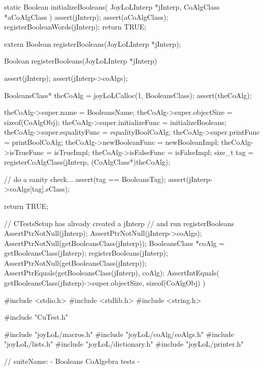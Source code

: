 \stopCHeader

\startCCode
static Boolean initializeBooleans(
  JoyLoLInterp *jInterp,
  CoAlgClass   *aCoAlgClass
) {
  assert(jInterp);
  assert(aCoAlgClass);
  registerBooleanWords(jInterp);
  return TRUE;
}
\stopCCode

\startCHeader
extern Boolean registerBooleans(JoyLoLInterp *jInterp);
\stopCHeader
{}

\startCCode
Boolean registerBooleans(JoyLoLInterp *jInterp) {
  assert(jInterp);
  assert(jInterp->coAlgs);
  
  BooleansClass* theCoAlg
    = joyLoLCalloc(1, BooleansClass);
  assert(theCoAlg);
  
  theCoAlg->super.name           = BooleansName;
  theCoAlg->super.objectSize     = sizeof(CoAlgObj);
  theCoAlg->super.initializeFunc = initializeBooleans;
  theCoAlg->super.equalityFunc   = equalityBoolCoAlg;
  theCoAlg->super.printFunc      = printBoolCoAlg;
  theCoAlg->newBooleanFunc       = newBooleanImpl;
  theCoAlg->isTrueFunc           = isTrueImpl;
  theCoAlg->isFalseFunc          = isFalseImpl;
  size_t tag =
    registerCoAlgClass(jInterp, (CoAlgClass*)theCoAlg);
  
  // do a sanity check...
  assert(tag == BooleansTag);
  assert(jInterp->coAlgs[tag].sClass);
   
  return TRUE;
}
\stopCCode


\startCTest
  // CTestsSetup has already created a jInterp
  // and run registerBooleans
  AssertPtrNotNull(jInterp);
  AssertPtrNotNull(jInterp->coAlgs);
  AssertPtrNotNull(getBooleansClass(jInterp));
  BooleansClass *coAlg = getBooleansClass(jInterp);
  registerBooleans(jInterp);
  AssertPtrNotNull(getBooleansClass(jInterp));
  AssertPtrEquals(getBooleansClass(jInterp), coAlg);
  AssertIntEquals(
    getBooleansClass(jInterp)->super.objectSize,
    sizeof(CoAlgObj)
  )
\stopCTest
\stopTestCase
\stopTestSuite

\starttyping
#include <stdio.h>
#include <stdlib.h>
#include <string.h>

#include "CuTest.h"

#include "joyLoL/macros.h"
#include "joyLoL/coAlg/coAlgs.h"
#include "joyLoL/lists.h"
#include "joyLoL/dictionary.h"
#include "joyLoL/printer.h"

// suiteName: - Booleans CoAlgebra tests -

